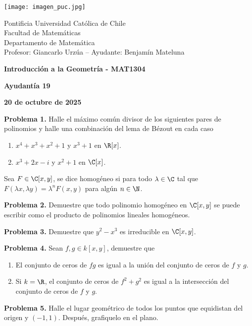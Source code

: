 \documentclass{article}
\begin{document}
\begin{minipage}{2.5cm}
    \texttt{[image: imagen\_puc.jpg]}
\end{minipage}
\begin{minipage}{14cm}
    {\sc Pontificia Universidad Católica de Chile\\
    Facultad de Matemáticas\\
    Departamento de Matemática\\
    Profesor: Giancarlo Urzúa -- Ayudante: Benjamín Mateluna}
\end{minipage}
\vspace{1ex}

{\centerline{\bf Introducción a la Geometría - MAT1304}
\centerline{\bf Ayudantía 19}}
\centerline{\bf 20 de octubre de 2025}

\vspace{1cm}
\noindent\textbf{Problema 1.} Halle el máximo común divisor de los siguientes pares de polinomios
y halle una combinación del lema de Bézout en cada caso

\begin{enumerate}
    \item $x^{4}+x^{3}+x^{2}+1$ y $x^{3}+1$ en $\R[x]$.
    
    \item $x^{3}+2x-i$ y $x^{2}+1$ en $\C[x]$.
\end{enumerate}

\begin{dfn}
    Sea $F\in\C[x,y]$, se dice homogéneo si para todo $\lambda\in\C$ tal que 
    $F(\lambda x,\lambda y)=\lambda^{n}F(x,y)$ para algún $n\in\N$.
\end{dfn}

\vspace{5mm}
\noindent\textbf{Problema 2.} Demuestre que todo polinomio homogéneo en $\C[x,y]$ se puede 
escribir como el producto de polinomios lineales homogéneos.

\vspace{5mm}
\noindent\textbf{Problema 3.} Demuestre que $y^{2}-x^{3}$ es irreducible en $\C[x,y]$.

\vspace{5mm}
\noindent\textbf{Problema 4.} Sean $f,g\in k[x,y]$, demuestre que
\begin{enumerate}
    \item El conjunto de ceros de $fg$ es igual a la unión del conjunto de ceros de $f$ y $g$.
    \item Si $k=\R$, el conjunto de ceros de $f^{2}+g^{2}$ es igual a la intersección del conjunto 
    de ceros de $f$ y $g$.
\end{enumerate}

\vspace{5mm}
\noindent\textbf{Problema 5.} Halle el lugar geométrico de todos los puntos que equidistan del
origen y $(-1,1)$. Después, grafiquelo en el plano.

\end{document}
